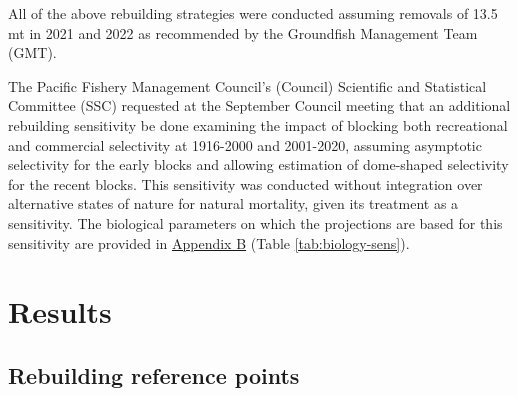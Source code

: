 \documentclass[11pt,
  english,
  a4paper,
]{article}
\begin{document}

All of the above rebuilding strategies were conducted assuming removals of 13.5 mt in 2021 and 2022 as recommended by the Groundfish Management Team (GMT).

\leavevmode\tagmcend\tagstructend\par


The Pacific Fishery Management Council's (Council) Scientific and Statistical Committee (SSC) requested at the September Council meeting that an additional rebuilding sensitivity be done examining the impact of blocking both recreational and commercial selectivity at 1916-2000 and 2001-2020, assuming asymptotic selectivity for the early blocks and allowing estimation of dome-shaped selectivity for the recent blocks. This sensitivity was conducted without integration over alternative states of nature for natural mortality, given its treatment as a sensitivity. The biological parameters on which the projections are based for this sensitivity are provided in {\protect\hyperlink{append_b}{Appendix B}\leavevmode\tagmcend\tagstructend} (Table \ref{tab:biology-sens}).

\leavevmode\tagmcend\tagstructend\par


\hypertarget{results}{%
\section{Results}\label{results}}

\leavevmode\tagmcend\tagstructend


\hypertarget{rebuilding-reference-points}{%
\subsection{Rebuilding reference points}\label{rebuilding-reference-points}}

\leavevmode\tagmcend\tagstructend

\end{document}
